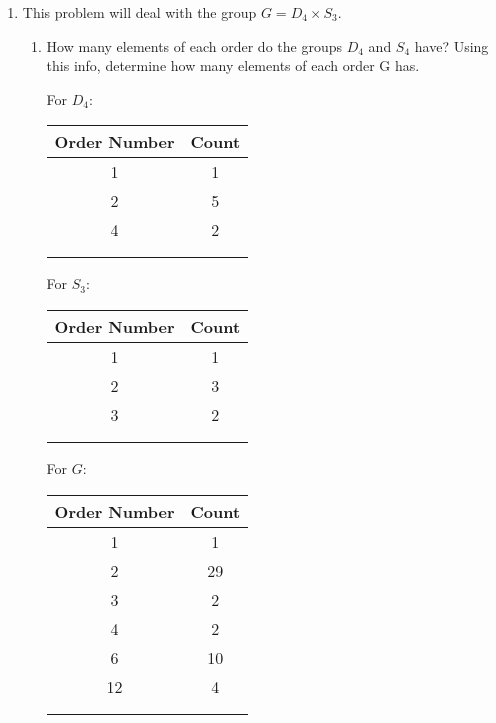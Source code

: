 \begin{enumerate}
\item This problem will deal with the group $G = D_4 \times S_3$.
        \begin{enumerate}
        \item How many elements of each order do the groups $D_4$ and $S_4$ have? Using this info, determine how many elements of each order G has.
            \begin{center}
            For $D_4$:\\
            \begin{tabular}{c c}
               Order Number & Count\\
               \hline
               1 & 1\\
               2 & 5\\
               4 & 2\\\\\\
            \end{tabular}
            \end{center}
            
            \begin{center}
            For $S_3$:\\
            \begin{tabular}{c c}
               Order Number & Count\\
               \hline
               1 & 1\\
               2 & 3\\
               3 & 2\\\\\\
            \end{tabular}
            \end{center}

            \begin{center}
            For $G$:\\
            \begin{tabular}{c c}
               Order Number & Count\\
               \hline
               1 & 1\\
               2 & 29\\
               3 & 2\\
               4 & 2\\
               6 & 10\\
               12 & 4\\\\\\
            \end{tabular}
            \end{center}        


\end{enumerate}
\end{enumerate}
